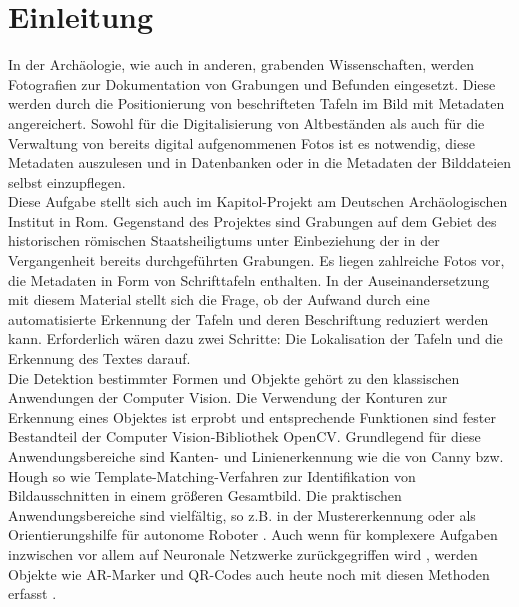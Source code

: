 \section{Einleitung}


In der Archäologie, wie auch in anderen, \glqq grabenden\grqq{} Wissenschaften, werden Fotografien zur Dokumentation von Grabungen und Befunden eingesetzt. Diese werden durch die Positionierung von beschrifteten Tafeln im Bild mit Metadaten angereichert. Sowohl für die Digitalisierung von Altbeständen als auch für die Verwaltung von bereits digital aufgenommenen Fotos ist es notwendig, diese Metadaten auszulesen und in Datenbanken oder in die Metadaten der Bilddateien selbst einzupflegen.\\
Diese Aufgabe stellt sich auch im Kapitol-Projekt am Deutschen Archäologischen Institut in Rom. Gegenstand des Projektes sind Grabungen auf dem Gebiet des historischen römischen Staatsheiligtums unter Einbeziehung der in der Vergangenheit bereits durchgeführten Grabungen. Es liegen zahlreiche Fotos vor, die Metadaten in Form von Schrifttafeln enthalten. In der Auseinandersetzung mit diesem Material stellt sich die Frage, ob der Aufwand durch eine automatisierte Erkennung der Tafeln und deren Beschriftung reduziert werden kann. Erforderlich wären dazu zwei Schritte: Die Lokalisation der Tafeln und die Erkennung des Textes darauf.\\
Die Detektion bestimmter Formen und Objekte gehört zu den klassischen Anwendungen der Computer Vision. Die Verwendung der Konturen zur Erkennung eines Objektes ist erprobt und entsprechende Funktionen sind fester Bestandteil der Computer Vision-Bibliothek OpenCV. Grundlegend für diese Anwendungsbereiche sind Kanten- und Linienerkennung wie die von Canny \cite{cannyedge} bzw. Hough \cite{houghpatent}{} so wie Template-Matching-Verfahren \cite{opencvtemplatematching}{} zur Identifikation von Bildausschnitten in einem größeren Gesamtbild. Die praktischen Anwendungsbereiche sind vielfältig, so z.B. in der Mustererkennung \cite{adamek}{} oder als Orientierungshilfe für autonome Roboter \cite{shaw}{}. Auch wenn für komplexere Aufgaben inzwischen vor allem auf Neuronale Netzwerke zurückgegriffen wird \cite{introduction}{}, werden Objekte wie AR-Marker und QR-Codes auch heute noch mit diesen Methoden erfasst \cite{armarker}{}.\\
